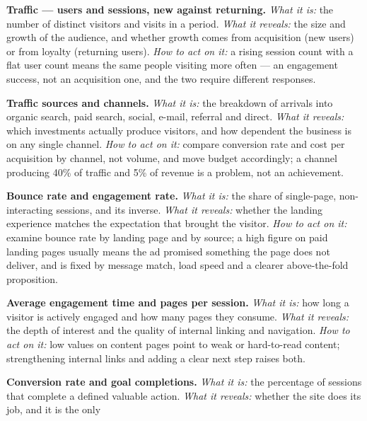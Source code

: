 \begin{qlist}
\begin{apts}
\item \textbf{Traffic --- users and sessions, new against returning.}
      \emph{What it is:} the number of distinct visitors and visits in a
      period. \emph{What it reveals:} the size and growth of the audience, and
      whether growth comes from acquisition (new users) or from loyalty
      (returning users). \emph{How to act on it:} a rising session count with a
      flat user count means the same people visiting more often --- an
      engagement success, not an acquisition one, and the two require different
      responses.
\item \textbf{Traffic sources and channels.} \emph{What it is:} the breakdown
      of arrivals into organic search, paid search, social, e-mail, referral
      and direct. \emph{What it reveals:} which investments actually produce
      visitors, and how dependent the business is on any single channel.
      \emph{How to act on it:} compare conversion rate and cost per acquisition
      by channel, not volume, and move budget accordingly; a channel producing
      40\% of traffic and 5\% of revenue is a problem, not an achievement.
\item \textbf{Bounce rate and engagement rate.} \emph{What it is:} the share of
      single-page, non-interacting sessions, and its inverse. \emph{What it
      reveals:} whether the landing experience matches the expectation that
      brought the visitor. \emph{How to act on it:} examine bounce rate by
      landing page and by source; a high figure on paid landing pages usually
      means the ad promised something the page does not deliver, and is fixed
      by message match, load speed and a clearer above-the-fold proposition.
\item \textbf{Average engagement time and pages per session.} \emph{What it
      is:} how long a visitor is actively engaged and how many pages they
      consume. \emph{What it reveals:} the depth of interest and the quality of
      internal linking and navigation. \emph{How to act on it:} low values on
      content pages point to weak or hard-to-read content; strengthening
      internal links and adding a clear next step raises both.
\item \textbf{Conversion rate and goal completions.} \emph{What it is:} the
      percentage of sessions that complete a defined valuable action.
      \emph{What it reveals:} whether the site does its job, and it is the only

\end{apts}
\end{qlist}
